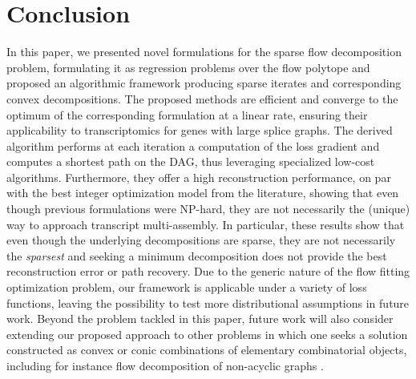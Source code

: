 \documentclass{ecai}
\begin{document}
\section{Conclusion}

In this paper, we presented novel formulations for the sparse flow decomposition problem, formulating it as regression problems over the flow polytope and proposed an algorithmic framework producing sparse iterates and corresponding convex decompositions.
The proposed methods are efficient and converge to the optimum of the corresponding formulation at a linear rate, ensuring their applicability to transcriptomics for genes with large splice graphs.
The derived algorithm performs at each iteration a computation of the loss gradient and computes a shortest path on the DAG, thus leveraging specialized low-cost algorithms.
Furthermore, they offer a high reconstruction performance, on par with the best integer optimization model from the literature, showing that even though previous formulations were NP-hard, they are not necessarily the (unique) way to approach transcript multi-assembly.
In particular, these results show that even though the underlying decompositions are sparse, they are not necessarily the \emph{sparsest} and seeking a minimum decomposition does not provide the best reconstruction error or path recovery.
Due to the generic nature of the flow fitting optimization problem, our framework is applicable under a variety of loss functions, leaving the possibility to test more distributional assumptions in future work.
Beyond the problem tackled in this paper, future work will also consider extending our proposed approach to other problems in which one seeks a solution constructed as convex or conic combinations of elementary combinatorial objects, including for instance flow decomposition of non-acyclic graphs \cite{sena2024flowtigs}.


\end{document}
